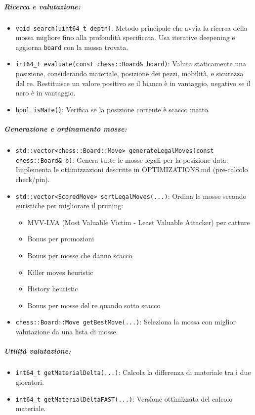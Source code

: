 \subparagraph{Ricerca e valutazione:}
\begin{itemize}
  \item \texttt{void search(uint64\_t depth)}: Metodo principale che avvia la ricerca della mossa migliore
        fino alla profondità specificata. Usa iterative deepening e aggiorna \texttt{board} con la mossa trovata.

  \item \texttt{int64\_t evaluate(const chess::Board\& board)}: Valuta staticamente una posizione,
        considerando materiale, posizione dei pezzi, mobilità, e sicurezza del re. Restituisce un
        valore positivo se il bianco è in vantaggio, negativo se il nero è in vantaggio.

  \item \texttt{bool isMate()}: Verifica se la posizione corrente è scacco matto.
\end{itemize}

\subparagraph{Generazione e ordinamento mosse:}
\begin{itemize}
  \item \texttt{std::vector<chess::Board::Move> generateLegalMoves(const chess::Board\& b)}:
        Genera tutte le mosse legali per la posizione data. Implementa le ottimizzazioni descritte
        in OPTIMIZATIONS.md (pre-calcolo check/pin).

  \item \texttt{std::vector<ScoredMove> sortLegalMoves(...)}: Ordina le mosse secondo euristiche
        per migliorare il pruning:
        \begin{itemize}
          \item MVV-LVA (Most Valuable Victim - Least Valuable Attacker) per catture
          \item Bonus per promozioni
          \item Bonus per mosse che danno scacco
          \item Killer moves heuristic
          \item History heuristic
          \item Bonus per mosse del re quando sotto scacco
        \end{itemize}

  \item \texttt{chess::Board::Move getBestMove(...)}: Seleziona la mossa con miglior valutazione
        da una lista di mosse.
\end{itemize}

\subparagraph{Utilità valutazione:}
\begin{itemize}
  \item \texttt{int64\_t getMaterialDelta(...)}: Calcola la differenza di materiale tra i due giocatori.
  \item \texttt{int64\_t getMaterialDeltaFAST(...)}: Versione ottimizzata del calcolo materiale.
\end{itemize}

